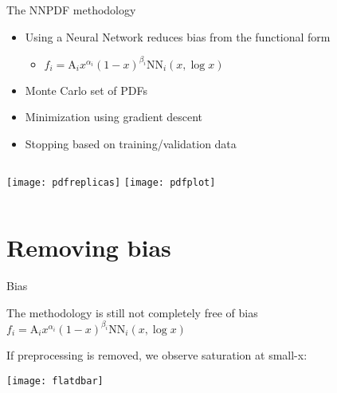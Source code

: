 \begin{frame}{The NNPDF methodology}

\vspace*{\titleskip}

\begin{itemize}
\item Using a Neural Network reduces bias from the functional form
\begin{itemize}
\item $f_i=\text{A}_ix^{\alpha_i}(1-x)^{\beta_i}\text{NN}_i(x,\log x)$
\end{itemize}
\item Monte Carlo set of PDFs
\item Minimization using gradient descent 
\item Stopping based on training/validation data
\end{itemize}

\vspace*{\secondskip}

\begin{columns}[T,onlytextwidth]
	\texttt{[image: pdfreplicas]}
	\texttt{[image: pdfplot]}
\end{columns}

\end{frame}


\section{Removing bias}


\begin{frame}{Bias}

\vspace*{\titleskip}
The methodology is still not completely free of bias $f_i=\text{A}_ix^{\alpha_i}(1-x)^{\beta_i}\text{NN}_i(x,\log x)$

If preprocessing is removed, we observe saturation at small-x:
\vspace*{\secondskip}

\begin{center}
\texttt{[image: flatdbar]}
\end{center}

\end{frame}


